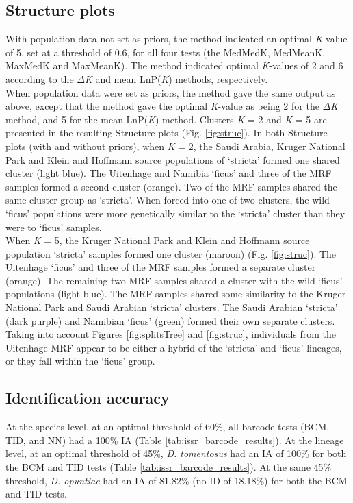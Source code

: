 \subsection{Structure plots}
With population data not set as priors, the \citet{puechmaille2016program} method indicated an optimal \textit{K}-value of 5, set at a threshold of 0.6, for all four tests (the MedMedK, MedMeanK, MaxMedK and MaxMeanK). The \citet{evanno2005detecting} method indicated optimal \textit{K}-values of 2 and 6 according to the $\Delta$\textit{K} and mean LnP(\textit{K}) methods, respectively. \\
When population data were set as priors, the \citet{puechmaille2016program} method gave the same output as above, except that the \citet{evanno2005detecting} method gave the optimal \textit{K}-value as being 2 for the $\Delta$\textit{K} method, and 5 for the mean LnP(\textit{K}) method. Clusters \textit{K} = 2 and \textit{K} = 5 are presented in the resulting Structure plots (Fig. \ref{fig:struc}). 
In both Structure plots (with and without priors), when \textit{K} = 2, the Saudi Arabia, Kruger National Park and Klein and Hoffmann source populations of `stricta' formed one shared cluster (light blue). The Uitenhage and Namibia `ficus' and three of the MRF samples formed a second cluster (orange). Two of the MRF samples shared the same cluster group as `stricta'. When forced into one of two clusters, the wild `ficus' populations were more genetically similar to the `stricta' cluster than they were to `ficus' samples. \\
When \textit{K} = 5, the Kruger National Park and Klein and Hoffmann source population `stricta' samples formed one cluster (maroon) (Fig. \ref{fig:struc}). The Uitenhage `ficus' and three of the MRF samples formed a separate cluster (orange). The remaining two MRF samples shared a cluster with the wild `ficus' populations (light blue). The MRF samples shared some similarity to the Kruger National Park and Saudi Arabian `stricta' clusters. The Saudi Arabian `stricta' (dark purple) and Namibian `ficus' (green) formed their own separate clusters. Taking into account Figures \ref{fig:splitsTree} and \ref{fig:struc}, individuals from the Uitenhage MRF appear to be either a hybrid of the `stricta' and `ficus' lineages, or they fall within the `ficus' group. 

\subsection{Identification accuracy}
At the species level, at an optimal threshold of 60\%, all barcode tests (BCM, TID, and NN) had a 100\% IA (Table \ref{tab:issr_barcode_results}). At the lineage level, at an optimal threshold of 45\%, \textit{D. tomentosus} had an IA of 100\% for both the BCM and TID tests (Table \ref{tab:issr_barcode_results}). At the same 45\% threshold, \textit{D. opuntiae} had an IA of 81.82\% (no ID of 18.18\%) for both the BCM and TID tests.


